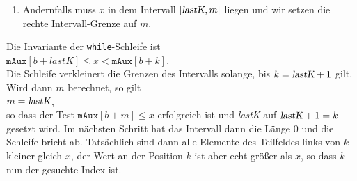 \begin{enumerate}
\begin{enumerate}
      \item Andernfalls muss $x$ in dem Intervall $[\textsl{lastK}, m]$ liegen und wir setzen die
            rechte Intervall-Grenze auf $m$.
      \end{enumerate}
      Die Invariante der \texttt{while}-Schleife ist
      \\[0.2cm]
      \hspace*{1.3cm}
      $\mathtt{mAux}[b + lastK] \leq x < \mathtt{mAux}[b + k]$.
      \\[0.2cm]
      Die Schleife verkleinert die Grenzen des Intervalls solange, bis $k = \textsl{lastK} + 1$
      gilt.  Wird dann $m$ berechnet, so gilt
      \\[0.2cm]
      \hspace*{1.3cm}
      $m = \textsl{lastK}$,
      \\[0.2cm]
      so dass der Test $\texttt{mAux}[b + m] \leq x$ erfolgreich ist und \textsl{lastK} auf 
      $\textsl{lastK} + 1 = k$ gesetzt wird.  Im n\"achsten Schritt hat das Intervall dann die L\"ange
      0 und die Schleife bricht ab.  Tats\"achlich sind dann alle Elemente des Teilfeldes links von
      $k$ kleiner-gleich $x$, der Wert an der Position $k$ ist aber echt gr\"o{\ss}er als $x$, so dass $k$
      nun der gesuchte Index ist.
\end{enumerate}


